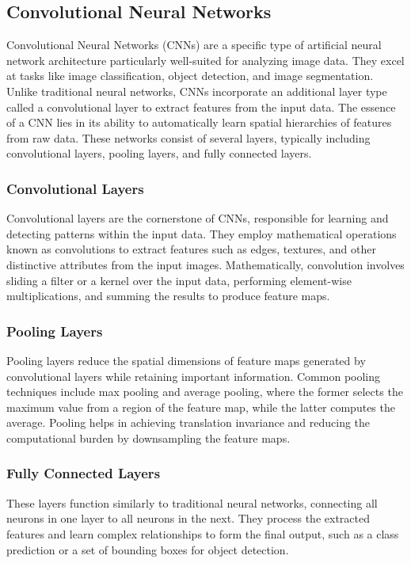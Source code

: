 \documentclass{article}
\begin{document}
\subsection{Convolutional Neural Networks}
Convolutional Neural Networks (CNNs) are a specific type of artificial neural network architecture particularly well-suited for analyzing image data. They excel at tasks like image classification, object detection, and image segmentation. Unlike traditional neural networks, CNNs incorporate an additional layer type called a convolutional layer to extract features from the input data. The essence of a CNN lies in its ability to automatically learn spatial hierarchies of features from raw data. These networks consist of several layers, typically including convolutional layers, pooling layers, and fully connected layers.

\subsubsection{Convolutional Layers}
Convolutional layers are the cornerstone of CNNs, responsible for learning and detecting patterns within the input data. They employ mathematical operations known as convolutions to extract features such as edges, textures, and other distinctive attributes from the input images. Mathematically, convolution involves sliding a filter or a kernel over the input data, performing element-wise multiplications, and summing the results to produce feature maps.

\subsubsection{Pooling Layers}
Pooling layers reduce the spatial dimensions of feature maps generated by convolutional layers while retaining important information. Common pooling techniques include max pooling and average pooling, where the former selects the maximum value from a region of the feature map, while the latter computes the average. Pooling helps in achieving translation invariance and reducing the computational burden by downsampling the feature maps.

\subsubsection{Fully Connected Layers}
These layers function similarly to traditional neural networks, connecting all neurons in one layer to all neurons in the next. They process the extracted features and learn complex relationships to form the final output, such as a class prediction or a set of bounding boxes for object detection.
\end{document}
